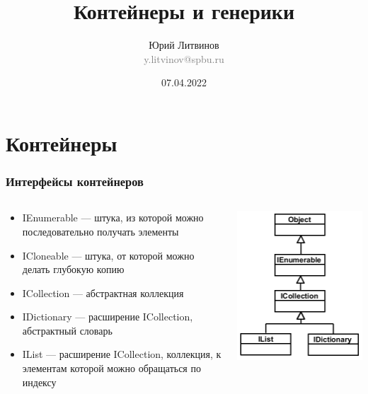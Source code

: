 \documentclass[xetex,mathserif,serif]{beamer}
\title{Контейнеры и генерики}
\author[Юрий Литвинов]{Юрий Литвинов\\\small{\textcolor{gray}{y.litvinov@spbu.ru}}}
\date{07.04.2022}
\begin{document}
    \frame{\titlepage}

    \section{Контейнеры}

    \begin{frame}
        \frametitle{Интерфейсы контейнеров}
        \begin{columns}
            \begin{column}{0.65\textwidth}
                \begin{itemize}
                    \item IEnumerable --- штука, из которой можно последовательно получать элементы
                    \item ICloneable --- штука, от которой можно делать глубокую копию
                    \item ICollection --- абстрактная коллекция
                    \item IDictionary --- расширение ICollection, абстрактный словарь
                    \item IList --- расширение ICollection, коллекция, к элементам которой можно обращаться по индексу
                \end{itemize}
            \end{column}
            \begin{column}{0.3\textwidth}
                \includegraphics[width=\textwidth]{interfaces.png}
            \end{column}
        \end{columns}
    \end{frame}
\end{document}
